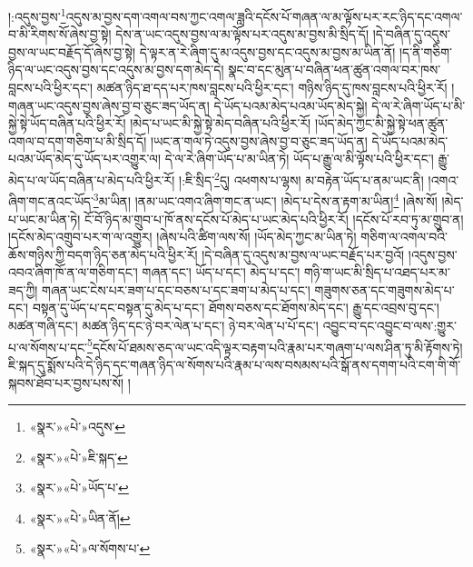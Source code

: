 །:འདུས་བྱས་\footnote{«སྣར་»«པེ་»འདུས་}འདུས་མ་བྱས་དག་འགལ་བས་ཀྱང་འགལ་ཟླའི་དངོས་པོ་གཞན་ལ་མ་ལྟོས་པར་རང་ཉིད་དང་འགལ་བ་མི་རིགས་སོ་ཞེས་བྱ་སྟེ། དེས་ན་ཡང་འདུས་བྱས་ལ་མ་ལྟོས་པར་འདུས་མ་བྱས་མི་སྲིད་དོ། །དེ་བཞིན་དུ་འདུས་བྱས་ལ་ཡང་བརྗོད་དོ་ཞེས་བྱ་སྟེ། དེ་ལྟར་ན་རེ་ཞིག་དུ་མ་འདུས་བྱས་དང་འདུས་མ་བྱས་མ་ཡིན་ནོ། །ད་ནི་གཅིག་ཉིད་ལ་ཡང་འདུས་བྱས་དང་འདུས་མ་བྱས་དག་མེད་དེ། སྣང་བ་དང་མུན་པ་བཞིན་ཕན་ཚུན་འགལ་བར་ཁས་བླངས་པའི་ཕྱིར་དང་། མཚན་ཉིད་ཐ་དད་པར་ཁས་བླངས་པའི་ཕྱིར་དང་། གཉིས་ཉིད་དུ་ཁས་བླངས་པའི་ཕྱིར་རོ། །གཞན་ཡང་འདུས་བྱས་ཞེས་བྱ་བ་ཅུང་ཟད་ཡོད་ན། དེ་ཡོད་པའམ་མེད་པའམ་ཡོད་མེད་སྐྱེ། དེ་ལ་རེ་ཞིག་ཡོད་པ་མི་སྐྱེ་སྟེ་ཡོད་བཞིན་པའི་ཕྱིར་རོ། །མེད་པ་ཡང་མི་སྐྱེ་སྟེ་མེད་བཞིན་པའི་ཕྱིར་རོ། །ཡོད་མེད་ཀྱང་མི་སྐྱེ་སྟེ་ཕན་ཚུན་འགལ་བ་དག་གཅིག་པ་མི་སྲིད་དོ། །ཡང་ན་གལ་ཏེ་འདུས་བྱས་ཞེས་བྱ་བ་ཅུང་ཟད་ཡོད་ན། དེ་ཡོད་པའམ་མེད་པའམ་ཡོད་མེད་དུ་ཡོད་པར་འགྱུར་ལ། དེ་ལ་རེ་ཞིག་ཡོད་པ་མ་ཡིན་ཏེ། ཡོད་པ་རྒྱུ་ལ་མི་ལྟོས་པའི་ཕྱིར་དང་། རྒྱུ་མེད་པ་ལ་ཡོད་བཞིན་པ་མེད་པའི་ཕྱིར་རོ། །:ཇི་སྲིད་\footnote{«སྣར་»«པེ་»ཇི་སྐད་}དུ། འཕགས་པ་ལྷས། མ་བརྟེན་ཡོད་པ་ནམ་ཡང་ནི། །འགའ་ཞིག་གང་ནའང་ཡོད་\footnote{«སྣར་»«པེ་»ཡོད་པ་}མ་ཡིན། །ནམ་ཡང་འགའ་ཞིག་གང་ན་ཡང་། །མེད་པ་དེས་ན་རྟག་མ་ཡིན།\footnote{«སྣར་»«པེ་»ཡིན་ནོ།} །ཞེས་སོ། །མེད་པ་ཡང་མ་ཡིན་ཏེ། ངོ་བོ་ཉིད་མ་གྲུབ་པ་ཁོ་ནས་དངོས་པོ་མེད་པ་ཡང་མེད་པའི་ཕྱིར་རོ། །དངོས་པོ་རབ་ཏུ་མ་གྲུབ་ན། །དངོས་མེད་འགྲུབ་པར་ག་ལ་འགྱུར། །ཞེས་པའི་ཚིག་ལས་སོ། །ཡོད་མེད་ཀྱང་མ་ཡིན་ཏེ། གཅིག་ལ་འགལ་བའི་ཆོས་གཉིས་ཀྱི་བདག་ཉིད་ཅན་མེད་པའི་ཕྱིར་རོ། །དེ་བཞིན་དུ་འདུས་མ་བྱས་ལ་ཡང་བརྗོད་པར་བྱའོ། །འདུས་བྱས་འབའ་ཞིག་ཁོ་ན་ལ་གཅིག་དང་། གཞན་དང་། ཡོད་པ་དང་། མེད་པ་དང་། གཉི་ག་ཡང་མི་སྲིད་པ་འཐད་པར་མ་ཟད་ཀྱི། གཞན་ཡང་ངེས་པར་ཟག་པ་དང་བཅས་པ་དང་ཟག་པ་མེད་པ་དང་། གཟུགས་ཅན་དང་གཟུགས་མེད་པ་དང་། བསྟན་དུ་ཡོད་པ་དང་བསྟན་དུ་མེད་པ་དང་། ཐོགས་བཅས་དང་ཐོགས་མེད་དང་། རྒྱུ་དང་འབྲས་བུ་དང་། མཚན་གཞི་དང་། མཚན་ཉིད་དང་ཉེ་བར་ལེན་པ་དང་། ཉེ་བར་ལེན་པ་པོ་དང་། འབྱུང་བ་དང་འབྱུང་བ་ལས་:གྱུར་པ་ལ་སོགས་པ་དང་\footnote{«སྣར་»«པེ་»ལ་སོགས་པ་}དངོས་པོ་ཐམས་ཅད་ལ་ཡང་འདི་ལྟར་བརྟག་པའི་རྣམ་པར་གཞག་པ་ལས་ཤིན་ཏུ་མི་རྟོགས་ཏེ། ཇི་སྐད་དུ་སྨོས་པའི་དེ་ཉིད་དང་གཞན་ཉིད་ལ་སོགས་པའི་རྣམ་པ་ལས་བསམས་པའི་སྒོ་ནས་དགག་པའི་ངག་གི་གོ་སྐབས་ཐོབ་པར་བྱས་པས་སོ། །
